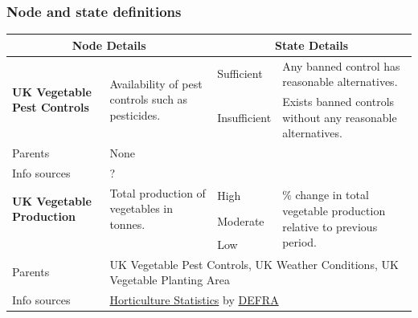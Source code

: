 \documentclass[12pt,notitlepage]{article}
\begin{document}
\subsubsection{Node and state definitions}\label{subsubsec:define1}
\begin{tabularx}{\textwidth}{
p{}p{}p{}p{}}  
\toprule
\multicolumn{2}{c}{\textbf{Node Details}}	& \multicolumn{2}{c}{\textbf{State Details}}\\
\midrule
\multirow{2}{0.175\textwidth}{\textbf{UK Vegetable Pest Controls}}
& \multirow{2}{0.275\textwidth}{Availability of pest controls such as pesticides.}
  & Sufficient 		& Any banned control has reasonable alternatives.\\
\cline{3-4}
& & Insufficient 	& Exists banned controls without any reasonable alternatives.\\
Parents & \multicolumn{3}{p{0.75\textwidth}}{None}\\
Info sources & \multicolumn{3}{p{0.75\textwidth}}{?}\\
\midrule
\multirow{2}{0.175\textwidth}{\textbf{UK Vegetable Production}}	
& \multirow{2}{0.275\textwidth}{Total production of vegetables in tonnes.}
  & High 		& \multirow{3}{0.375\textwidth}{\% change in total vegetable production relative to previous period.}\\
& & Moderate 	&\\
& & Low 		&\\
Parents & \multicolumn{3}{p{0.75\textwidth}}{UK Vegetable Pest Controls, UK Weather Conditions, UK Vegetable Planting Area}\\
Info sources & \multicolumn{3}{p{0.75\textwidth}}{\href{https://www.gov.uk/government/collections/horticultural-statistics}{Horticulture Statistics} by \href{https://www.gov.uk/government/organisations/department-for-environment-food-rural-affairs}{DEFRA}}\\
\midrule
\end{tabularx}
\end{document}
